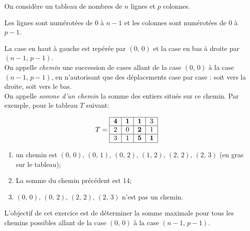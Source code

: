 \documentclass[a4paper,12pt,french]{article}
\begin{document}

On considère un tableau de nombres de $n$ lignes et $p$ colonnes.

Les lignes sont numérotées de $0$ à $n−1$ et les colonnes sont
numérotées de $0$ à $p−1$.

La case en haut à gauche est repérée par $(0,\,0)$ et la case en bas à droite par $(n−1,\,p−1)$.\\

On appelle \textit{chemin} une succession de cases allant de la case $(0,\,0)$ à la case $(n−1,\,p−1)$, en n’autorisant que des
déplacements case par case : soit vers la droite, soit vers le bas.\\


On appelle \textit{somme d'un chemin} la somme des entiers situés sur ce chemin. Par exemple, pour le tableau  $T$ suivant:

$$T=
\begin{tabular}{|c|c|c|c|}
\hline
\textbf{4}&\textbf{1}&\textbf{1}&3\\
\hline
2&0&\textbf{2}&1\\
\hline
3&1&\textbf{5}&\textbf{1}\\
\hline
\end{tabular}$$



\begin{enumerate}[--]
	\item 	un chemin est $(0,\,0),\,(0,\,1),\,(0,\,2),\,(1,\,2),\,(2,\,2),\,(2,\,3)$ (en gras sur le tableau);
	\item 	La somme du chemin précédent est 14;
    \item   $(0,\,0),\,(0,\,2),\,(2,\,2),\,(2,\,3)$ n’est pas un chemin.
\end{enumerate}

L’objectif de cet exercice est de déterminer la somme maximale pour tous les chemins possibles allant de la case $(0,\,0)$
à la case $(n−1,\,p−1)$.
\end{document}
